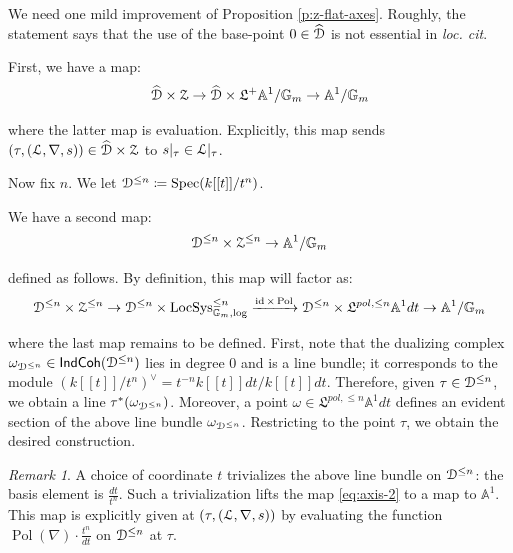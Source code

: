\documentclass[reqno,11pt]{amsart}
\numberwithin{equation}{subsection}
\theoremstyle{remark}
\newtheorem{rem}[thm]{Remark}
\newcommand{\xar}[1]{\xrightarrow{#1}}
\newcommand{\bA}{{\mathbb A}}
\newcommand{\bG}{{\mathbb G}}
\newcommand{\sD}{{\EuScript D}}
\newcommand{\sL}{{\EuScript L}}
\newcommand{\sZ}{{\EuScript Z}}
\newcommand{\fL}{{\mathfrak L}}
\newcommand{\on}{\operatorname}
\newcommand{\Spec}{\on{Spec}}
\newcommand{\id}{\on{id}}
\newcommand{\LocSys}{\on{LocSys}}
\newcommand{\IndCoh}{\mathsf{IndCoh}}
\newcommand{\Pol}{\on{Pol}}
\begin{document}
\subsubsection{}\label{ss:c-redux}

We need one mild improvement of Proposition \ref{p:z-flat-axes}.
Roughly, the statement says that the use of the base-point $0 \in \widehat{\sD}$
is not essential in \emph{loc. cit}.

First, we have a map:
%
\begin{equation}\label{eq:axis-1}
\widehat{\sD} \times \sZ \to \widehat{\sD} \times \fL^+\bA^1/\bG_m \to 
\bA^1/\bG_m
\end{equation}

\noindent where the latter map is evaluation. Explicitly, this map 
sends $(\tau,(\sL,\nabla,s)) \in \widehat{\sD} \times \sZ$ to 
$s|_{\tau} \in \sL|_{\tau}$.

Now fix $n$. We let $\sD^{\leq n} \coloneqq \Spec(k[[t]]/t^n)$. 

We have a second map:
%
\begin{equation}\label{eq:axis-2}
\sD^{\leq n} \times \sZ^{\leq n} \to \bA^1/\bG_m
\end{equation}

\noindent defined as follows. By definition, this map will
factor as:
%
\[
\sD^{\leq n} \times \sZ^{\leq n} \to
\sD^{\leq n} \times \LocSys_{\bG_m,\log}^{\leq n} \xar{\id \times \Pol}
\sD^{\leq n} \times \fL^{pol,\leq n} \bA^1 dt \to 
\bA^1/\bG_m 
\]

\noindent where the last map remains to be defined. 
First, note that the dualizing complex
$\omega_{\sD^{\leq n}} \in \IndCoh(\sD^{\leq n})$ lies in degree $0$
and is a line bundle; it corresponds to the module $(k[[t]]/t^n)^{\vee} = 
t^{-n} k[[t]]dt/k[[t]]dt$. Therefore, given $\tau \in \sD^{\leq n}$, 
we obtain a line $\tau^*(\omega_{\sD^{\leq n}})$. Moreover,
a point $\omega \in \fL^{pol,\leq n} \bA^1 dt$ defines an evident section
of the above line bundle $\omega_{\sD^{\leq n}}$. Restricting to the
point $\tau$, we obtain the desired construction.

\begin{rem}

A choice of coordinate $t$ trivializes the above line bundle
on $\sD^{\leq n}$: the basis element is $\frac{dt}{t^n}$.
Such a trivialization lifts the map \eqref{eq:axis-2} to 
a map to $\bA^1$. This map is explicitly given at 
$(\tau,(\sL,\nabla,s))$ by evaluating the function
$\Pol(\nabla) \cdot \frac{t^n}{dt}$ on $\sD^{\leq n}$
at $\tau$.

\end{rem}
\end{document}
